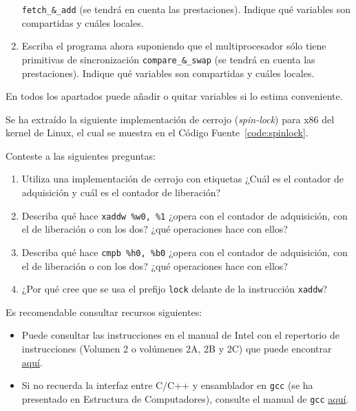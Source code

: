 \begin{ejercicio}
\begin{enumerate}
        \verb|fetch_&_add| (se tendrá en cuenta las prestaciones). Indique qué variables son compartidas y
        cuáles locales.
        \item Escriba el programa ahora suponiendo que el multiprocesador sólo tiene primitivas de
        sincronización \verb|compare_&_swap| (se tendrá en cuenta las prestaciones). Indique qué variables son
        compartidas y cuáles locales.
    \end{enumerate}
    \begin{observacion}
        En todos los apartados puede añadir o quitar variables si lo estima conveniente.
    \end{observacion}
\end{ejercicio}

\begin{ejercicio}
    Se ha extraído la siguiente implementación de cerrojo (\textit{spin-lock}) para x86 del kernel de Linux, el cual se muestra
    en el Código Fuente~\ref{code:spinlock}.
    

    Conteste a las siguientes preguntas:
    \begin{enumerate}
        \item Utiliza una implementación de cerrojo con etiquetas ¿Cuál es el contador de adquisición y cuál es el
        contador de liberación?
        \item Describa qué hace \verb|xaddw %w0, %1| ¿opera con el contador de adquisición, con el de liberación o con
        los dos? ¿qué operaciones hace con ellos?
        \item Describa qué hace \verb|cmpb %h0, %b0| ¿opera con el contador de adquisición, con el de liberación o con
        los dos? ¿qué operaciones hace con ellos?
        \item ¿Por qué cree que se usa el prefijo \verb|lock| delante de la instrucción \verb|xaddw|? 
    \end{enumerate}

    \begin{observacion} Es recomendable consultar recursos siguientes:
        \begin{itemize}
            \item Puede consultar las instrucciones en el manual de Intel con el repertorio de instrucciones
            (Volumen 2 o volúmenes 2A, 2B y 2C) que puede encontrar \href{http://www.intel.com/content/www/us/en/processors/architectures-software-developer-manuals.html}{\color{blue}\ul{aquí}}.
            \item Si no recuerda la interfaz entre C/C++ y ensamblador en \verb|gcc| (se ha presentado en Estructura de
            Computadores), consulte el manual de \verb|gcc| \href{http://gcc.gnu.org/onlinedocs/gcc-4.6.2/gcc/ExtendedAsm.html#Extended-Asm}{\color{blue}\ul{aquí}}.
        \end{itemize}
    \end{observacion}
\end{ejercicio}


